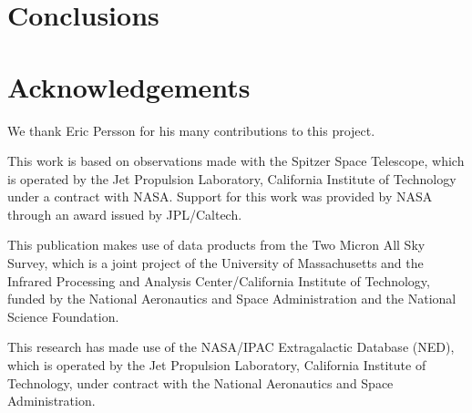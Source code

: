 \documentclass[a4paper,fleqn,usenatbib]{mnras}
\begin{document}


\section{Conclusions}
\label{sec:conclusions}

\section*{Acknowledgements}
\label{sec:acknowledgements}

We thank Eric Persson for his many contributions to this project.

This work is based on observations made with the Spitzer Space Telescope, which is operated by the Jet Propulsion Laboratory, California Institute of Technology under a contract with NASA. Support for this work was provided by NASA through an award issued by JPL/Caltech.

This publication makes use of data products from the Two Micron All Sky Survey, which is a joint project of the University of Massachusetts and the Infrared Processing and Analysis Center/California Institute of Technology, funded by the National Aeronautics and Space Administration and the National Science Foundation.

This research has made use of the NASA/IPAC Extragalactic Database (NED), which is operated by the Jet Propulsion Laboratory, California Institute of Technology, under contract with the National Aeronautics and Space Administration.



\end{document}

